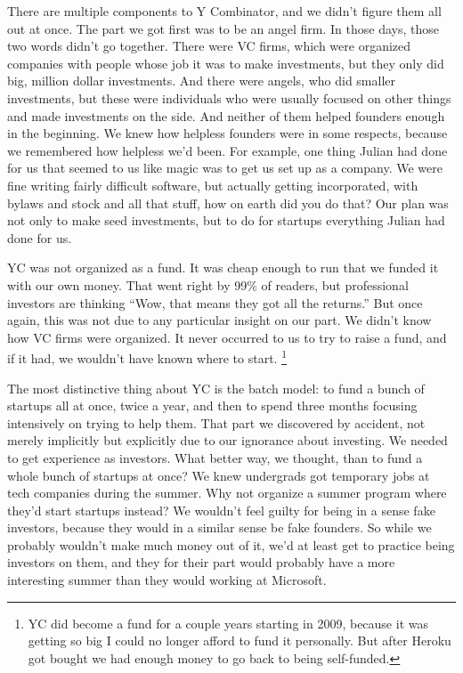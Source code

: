 There are multiple components to Y Combinator, and we didn't figure them
all out at once. The part we got first was to be an angel firm. In those
days, those two words didn't go together. There were VC firms, which
were organized companies with people whose job it was to make
investments, but they only did big, million dollar investments. And
there were angels, who did smaller investments, but these were
individuals who were usually focused on other things and made
investments on the side. And neither of them helped founders enough in
the beginning. We knew how helpless founders were in some respects,
because we remembered how helpless we'd been. For example, one thing
Julian had done for us that seemed to us like magic was to get us set up
as a company. We were fine writing fairly difficult software, but
actually getting incorporated, with bylaws and stock and all that stuff,
how on earth did you do that? Our plan was not only to make seed
investments, but to do for startups everything Julian had done for us.

YC was not organized as a fund. It was cheap enough to run that we
funded it with our own money. That went right by 99\% of readers, but
professional investors are thinking ``Wow, that means they got all the
returns.'' But once again, this was not due to any particular insight on
our part. We didn't know how VC firms were organized. It never occurred
to us to try to raise a fund, and if it had, we wouldn't have known
where to start. \footnote{YC did become a fund for a couple years starting in 2009,
because it was getting so big I could no longer afford to fund it
personally. But after Heroku got bought we had enough money to go back
to being self-funded.}

The most distinctive thing about YC is the batch model: to fund a bunch
of startups all at once, twice a year, and then to spend three months
focusing intensively on trying to help them. That part we discovered by
accident, not merely implicitly but explicitly due to our ignorance
about investing. We needed to get experience as investors. What better
way, we thought, than to fund a whole bunch of startups at once? We knew
undergrads got temporary jobs at tech companies during the summer. Why
not organize a summer program where they'd start startups instead? We
wouldn't feel guilty for being in a sense fake investors, because they
would in a similar sense be fake founders. So while we probably wouldn't
make much money out of it, we'd at least get to practice being investors
on them, and they for their part would probably have a more interesting
summer than they would working at Microsoft.

